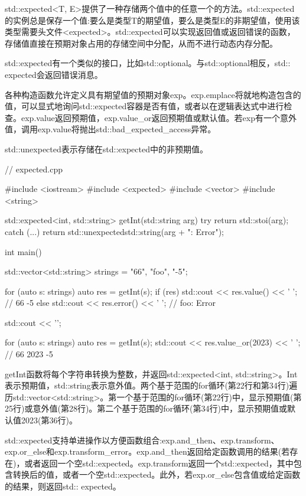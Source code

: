 std::expected<T, E>提供了一种存储两个值中的任意一个的方法。std::expected的实例总是保存一个值:要么是类型T的期望值，要么是类型E的非期望值，使用该类型需要头文件<expected>。std::expected可以实现返回值或返回错误的函数，存储值直接在预期对象占用的存储空间中分配，从而不进行动态内存分配。

std::expected有一个类似的接口，比如std::optional。与std::optional相反，std:: expected会返回错误消息。

各种构造函数允许定义具有期望值的预期对象exp。exp.emplace将就地构造包含的值，可以显式地询问std::expected容器是否有值，或者以在逻辑表达式中进行检查。exp.value返回预期值，exp.value\_or返回预期值或默认值。若exp有一个意外值，调用exp.value将抛出std::bad\_expected\_access异常。

std::unexpected表示存储在std::expected中的非预期值。


\begin{cpp}
// expected.cpp

#include <iostream>
#include <expected>
#include <vector>
#include <string>

std::expected<int, std::string> getInt(std::string arg) {
	try {
		return std::stoi(arg);
	}
	catch (...) {
		return std::unexpected{std::string(arg + ": Error")};
	}
}

int main() {

	std::vector<std::string> strings = {"66", "foo", "-5"};
	
	for (auto s: strings) {
		auto res = getInt(s);
		if (res) {
			std::cout << res.value() << ' '; // 66 -5
		}
		else {
			std::cout << res.error() << ' '; // foo: Error
		}
	}
	
	std::cout << '\n';
	
	for (auto s: strings) {
		auto res = getInt(s);
		std::cout << res.value_or(2023) << ' '; // 66 2023 -5
	}

}
\end{cpp}

getInt函数将每个字符串转换为整数，并返回std::expected<int, std::string>。Int表示预期值，std::string表示意外值。两个基于范围的for循环(第22行和第34行)遍历std::vector<std::string>。第一个基于范围的for循环(第22行)中，显示预期值(第25行)或意外值(第28行)。第二个基于范围的for循环(第34行)中，显示预期值或默认值2023(第36行)。

std::expected支持单进操作以方便函数组合:exp.and\_then、exp.transform、exp.or\_else和exp.transform\_error。exp.and\_then返回给定函数调用的结果(若存在)，或者返回一个空std::expected。exp.transform返回一个std::expected，其中包含转换后的值，或者一个空std::expected。此外，若exp.or\_else包含值或给定函数的结果，则返回std:: expected。

